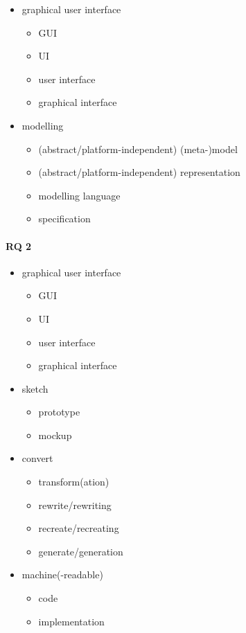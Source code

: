 \begin{itemize}
    \item graphical user interface
    \begin{itemize}
        \item GUI
        \item UI
        \item user interface
        \item graphical interface
    \end{itemize}
    \item modelling
    \begin{itemize}
        \item (abstract/platform-independent) (meta-)model
        \item (abstract/platform-independent) representation
        \item modelling language
        \item specification
    \end{itemize}
\end{itemize}

\paragraph{RQ 2}

\begin{itemize}
    \item graphical user interface
    \begin{itemize}
        \item GUI
        \item UI
        \item user interface
        \item graphical interface
    \end{itemize}
    \item sketch
    \begin{itemize}
        \item prototype
        \item mockup
    \end{itemize}
    \item convert
    \begin{itemize}
        \item transform(ation)
        \item rewrite/rewriting
        \item recreate/recreating
        \item generate/generation
    \end{itemize}
    \item machine(-readable)
    \begin{itemize}
        \item code
        \item implementation
    \end{itemize}
\end{itemize}

